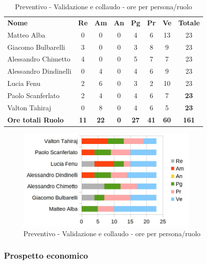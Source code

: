 		\begin{table} [h!]
			\begin{center}
				\begin{tabular} { m{3.5cm} c c c c c c c }
					\rowcolor{lightgray}
					\textbf{Nome} & \textbf{Re} & \textbf{Am} & \textbf{An} & \textbf{Pg} & \textbf{Pr} & \textbf{Ve} & \textbf{Totale} \\
					Matteo Alba & 0 & 0 & 0 & 4 & 6 & 13 & 23 \\
					Giacomo Bulbarelli & 3 & 0 & 0 & 3 & 8 & 9 & 23 \\
					Alessandro Chimetto & 4 & 0 & 0 & 5 & 7 & 7 & 23 \\
					Alessandro Dindinelli & 0 & 4 & 0 & 4 & 6 & 9 & 23 \\
					Lucia Fenu & 2 & 6 & 0 & 3 & 2 & 10 & 23 \\
					Paolo Scanferlato & 2 & 4 & 0 & 4 & 6 & 7 & \textbf{23} \\
					Valton Tahiraj & 0 & 8 & 0 & 4 & 6 & 5 & \textbf{23} \\
					\textbf{Ore totali Ruolo} & \textbf{11} & \textbf{22} & \textbf{0} & \textbf{27} & \textbf{41}& \textbf{60} & \textbf{161}
				\end{tabular}
				\caption{Preventivo - Validazione e collaudo - ore per persona/ruolo}
			\end{center}
		\end{table}
	
		\begin{figure} [h!]
			\centering
			\includegraphics[width=0.8\textwidth]{res/img/grafici/validazione_e_collaudo_ore_ruolo.jpg}
			\caption{Preventivo - Validazione e collaudo - ore per persona/ruolo} 
		\end{figure}
	
	\newpage
	
	\subsubsection{Prospetto economico}
	
